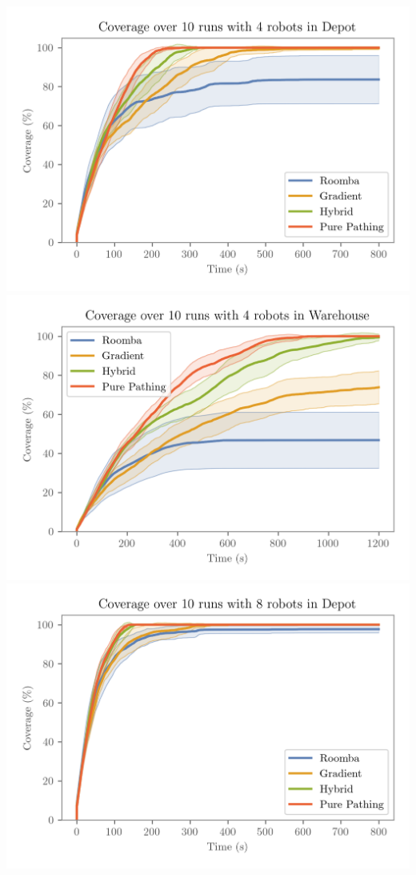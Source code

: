\\
\includegraphics[width=\w]{figures/plots/benchmarks/coverage-over-10-runs-with-4-robots-in-depot.png}
\hfill
\includegraphics[width=\w]{figures/plots/benchmarks/coverage-over-10-runs-with-4-robots-in-warehouse.png}
\\
\includegraphics[width=\w]{figures/plots/benchmarks/coverage-over-10-runs-with-8-robots-in-depot.png}
